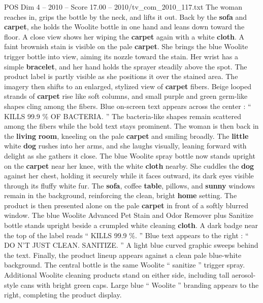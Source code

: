 \begin{textsample}{POS Dim 4 – 2010 – Score 17.00 – 2010/tv\_com\_2010\_117.txt}
The woman reaches in, grips the bottle by the neck, and lifts it out.
Back by the \textbf{sofa} and \textbf{carpet}, she holds the Woolite bottle in one hand and leans down toward the floor.
A close view shows her wiping the \textbf{carpet} again with a white \textbf{cloth}.
A faint brownish stain is visible on the pale \textbf{carpet}.
She brings the blue Woolite trigger bottle into view, aiming its nozzle toward the stain.
Her wrist has a simple \textbf{bracelet}, and her hand holds the sprayer steadily above the spot.
The product label is partly visible as she positions it over the stained area.
The imagery then shifts to an enlarged, stylized view of \textbf{carpet} fibers.
Beige looped strands of \textbf{carpet} rise like soft columns, and small purple and green germ-like shapes cling among the fibers.
Blue on-screen text appears across the center : “ KILLS 99.9 \% OF BACTERIA. ” The bacteria-like shapes remain scattered among the fibers while the bold text stays prominent.
The woman is then back in the \textbf{living} \textbf{room}, kneeling on the pale \textbf{carpet} and smiling broadly.
The \textbf{little} white \textbf{dog} rushes into her arms, and she laughs visually, leaning forward with delight as she gathers it close.
The blue Woolite spray bottle now stands upright on the \textbf{carpet} near her knee, with the white \textbf{cloth} nearby.
She cuddles the \textbf{dog} against her chest, holding it securely while it faces outward, its dark eyes visible through its fluffy white fur.
The \textbf{sofa}, coffee \textbf{table}, pillows, and \textbf{sunny} windows remain in the background, reinforcing the clean, bright \textbf{home} setting.
The product is then presented alone on the pale \textbf{carpet} in front of a softly blurred window.
The blue Woolite Advanced Pet Stain and Odor Remover plus Sanitize bottle stands upright beside a crumpled white cleaning \textbf{cloth}.
A dark badge near the top of the label reads “ KILLS 99.9 \%. ” Blue text appears to the right : “ DO N’T JUST CLEAN.
SANITIZE. ” A light blue curved graphic sweeps behind the text.
Finally, the product lineup appears against a clean pale blue-white background.
The central bottle is the same Woolite “ sanitize ” trigger spray.
Additional Woolite cleaning products stand on either side, including tall aerosol-style cans with bright green caps.
Large blue “ Woolite ” branding appears to the right, completing the product display.

\end{textsample}
